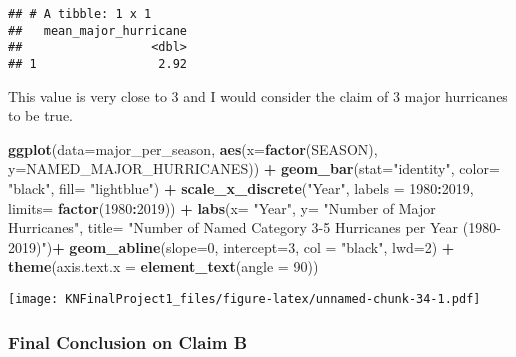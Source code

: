 \documentclass[
]{article}
\newenvironment{Shaded}{\begin{snugshade}}{\end{snugshade}}
\newcommand{\DataTypeTok}[1]{\textcolor[rgb]{0.13,0.29,0.53}{#1}}
\newcommand{\DecValTok}[1]{\textcolor[rgb]{0.00,0.00,0.81}{#1}}
\newcommand{\KeywordTok}[1]{\textcolor[rgb]{0.13,0.29,0.53}{\textbf{#1}}}
\newcommand{\NormalTok}[1]{#1}
\newcommand{\OperatorTok}[1]{\textcolor[rgb]{0.81,0.36,0.00}{\textbf{#1}}}
\newcommand{\StringTok}[1]{\textcolor[rgb]{0.31,0.60,0.02}{#1}}
\begin{document}
\begin{verbatim}
## # A tibble: 1 x 1
##   mean_major_hurricane
##                  <dbl>
## 1                 2.92
\end{verbatim}

This value is very close to 3 and I would consider the claim of 3 major
hurricanes to be true.

\begin{Shaded}
\begin{Highlighting}[]
\KeywordTok{ggplot}\NormalTok{(}\DataTypeTok{data=}\NormalTok{major_per_season, }\KeywordTok{aes}\NormalTok{(}\DataTypeTok{x=}\KeywordTok{factor}\NormalTok{(SEASON), }\DataTypeTok{y=}\NormalTok{NAMED_MAJOR_HURRICANES)) }\OperatorTok{+}
\KeywordTok{geom_bar}\NormalTok{(}\DataTypeTok{stat=}\StringTok{"identity"}\NormalTok{, }\DataTypeTok{color=} \StringTok{"black"}\NormalTok{, }\DataTypeTok{fill=} \StringTok{"lightblue"}\NormalTok{) }\OperatorTok{+}\StringTok{ }
\StringTok{  }\KeywordTok{scale_x_discrete}\NormalTok{(}\StringTok{"Year"}\NormalTok{, }\DataTypeTok{labels =} \DecValTok{1980}\OperatorTok{:}\DecValTok{2019}\NormalTok{, }\DataTypeTok{limits=} \KeywordTok{factor}\NormalTok{(}\DecValTok{1980}\OperatorTok{:}\DecValTok{2019}\NormalTok{)) }\OperatorTok{+}\StringTok{ }
\StringTok{  }\KeywordTok{labs}\NormalTok{(}\DataTypeTok{x=} \StringTok{"Year"}\NormalTok{, }\DataTypeTok{y=} \StringTok{"Number of Major Hurricanes"}\NormalTok{, }\DataTypeTok{title=} \StringTok{"Number of Named Category 3-5 Hurricanes per Year (1980-2019)"}\NormalTok{)}\OperatorTok{+}\StringTok{  }
\StringTok{  }\KeywordTok{geom_abline}\NormalTok{(}\DataTypeTok{slope=}\DecValTok{0}\NormalTok{, }\DataTypeTok{intercept=}\DecValTok{3}\NormalTok{,  }\DataTypeTok{col =} \StringTok{"black"}\NormalTok{, }\DataTypeTok{lwd=}\DecValTok{2}\NormalTok{) }\OperatorTok{+}
\StringTok{  }\KeywordTok{theme}\NormalTok{(}\DataTypeTok{axis.text.x =} \KeywordTok{element_text}\NormalTok{(}\DataTypeTok{angle =} \DecValTok{90}\NormalTok{)) }
\end{Highlighting}
\end{Shaded}

\texttt{[image: KNFinalProject1\_files/figure-latex/unnamed-chunk-34-1.pdf]}

\hypertarget{final-conclusion-on-claim-b}{%
\subsubsection{Final Conclusion on Claim
B}\label{final-conclusion-on-claim-b}}
\end{document}
